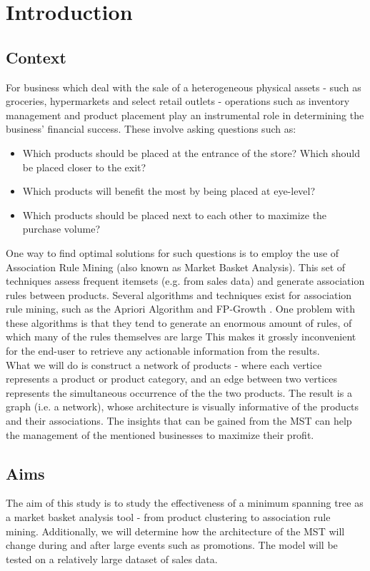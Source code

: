 \documentclass[a4paper,11pt]{article}
\begin{document}
\newpage
\tableofcontents

\newpage
\section{Introduction}
\subsection{Context}
For business which deal with the sale of a heterogeneous physical assets - such as groceries, hypermarkets and select retail outlets - operations such as inventory management and product placement play an instrumental role in determining the business' financial success. These involve asking questions such as:
\begin{itemize}
\item Which products should be placed at the entrance of the store? Which should be placed closer to the exit?
\item Which products will benefit the most by being placed at eye-level?
\item Which products should be placed next to each other to maximize the purchase volume?
\end{itemize}
One way to find optimal solutions for such questions is to employ the use of Association Rule Mining (also known as Market Basket Analysis). This set of techniques assess frequent itemsets (e.g. from sales data) and generate association rules between products. Several algorithms and techniques exist for association rule mining, such as the Apriori Algorithm and FP-Growth \cite{fp_growth}. One problem with these algorithms is that they tend to generate an enormous amount of rules, of which many of the rules themselves are large This makes it grossly inconvenient for the end-user to retrieve any actionable information from the results.\\
What we will do is construct a network of products - where each vertice represents a product or product category, and an edge between two vertices represents the simultaneous occurrence of the the two products. The result is a graph (i.e. a network), whose architecture is visually informative of the products and their associations.  The insights that can be gained from the MST can help the management of the mentioned businesses to maximize their profit.

\subsection{Aims}
The aim of this study is to study the effectiveness of a minimum spanning tree as a market basket analysis tool - from product clustering to association rule mining.  Additionally, we will determine how the architecture of the MST will change during and after large events such as promotions. The model will be tested on a relatively large dataset of sales data.
\end{document}
